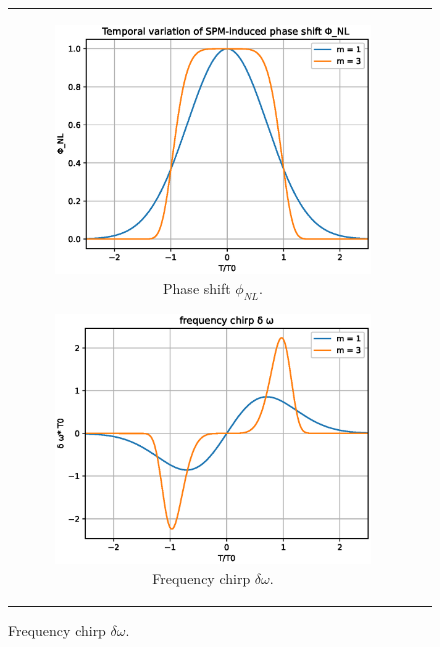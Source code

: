         
        
        \begin{figure}[label={fig:spmsg}, caption={Effect of SPM in a Gaussian pulse. Following equations \eqref{eq_phi} - \eqref{eq_spmchirpsg}. }]
        \centering
        \begin{tabular}[c]{cc}
        \centering
        \begin{subfigure}[b]{.53\textwidth}
		    \centering	
            \includegraphics[width=1\textwidth]{figures/chap3/shift.eps}
            \caption{Phase shift $\phi_{NL}$.}
            \label{fig:shift_s}
        \end{subfigure}
        \hfill
        \begin{subfigure}[b]{.53\textwidth}
		    \centering	
            \includegraphics[width=1\textwidth]{figures/chap3/chirp.eps}
            \caption{Frequency chirp $\delta \omega$.}
            \label{fig:chirp_s}
        \end{subfigure}
        \end{tabular}
        \end{figure}
        
